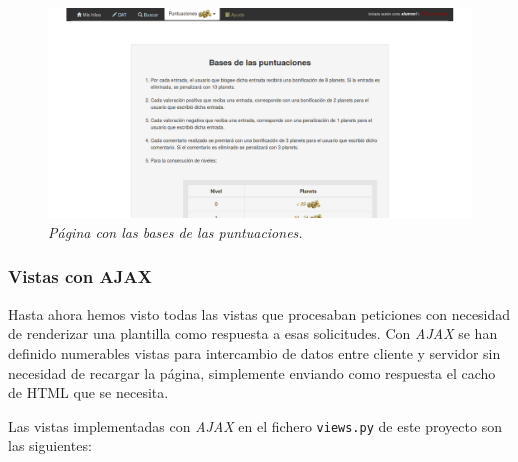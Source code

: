 \documentclass[a4paper, 12pt]{book}
\begin{document}
\begin{figure}
  \centering
  \includegraphics[width=17cm, keepaspectratio]{imagenes/HiloAlumnoInfoPuntuaciones}
  \caption{\textit{P\'agina con las bases de las puntuaciones.}}
  \label{fig:informacionpuntuaciones}
\end{figure}


\subsubsection{Vistas con AJAX} 
\label{sec:vistasajax}
Hasta ahora hemos visto todas las vistas que procesaban peticiones con necesidad de renderizar una plantilla como respuesta a esas solicitudes. Con 
\textit{AJAX} se han definido numerables vistas para intercambio de datos entre cliente y servidor sin necesidad de recargar la p\'agina, simplemente 
enviando como respuesta el cacho de HTML que se necesita.

Las vistas implementadas con \textit{AJAX} en el fichero \texttt{views.py} de este proyecto son las siguientes:
\end{document}
